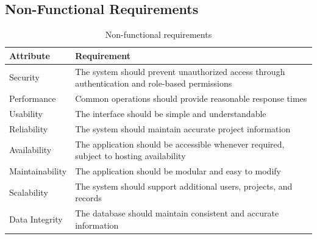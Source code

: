 \documentclass[11pt,a4paper]{article}
\newcommand{\hrow}{\rowcolor{gray!14}}
\newcommand{\tablestyle}{\centering\small\renewcommand{\arraystretch}{1.3}}
\begin{document}
\subsection{Non-Functional Requirements}
\begin{table}[H]
\tablestyle
\begin{tabularx}{\linewidth}{>{\raggedright\arraybackslash}p{3.2cm}Y}
\toprule
\hrow\textbf{Attribute} & \textbf{Requirement}\\
\midrule
Security & The system should prevent unauthorized access through authentication and role-based permissions\\
Performance & Common operations should provide reasonable response times\\
Usability & The interface should be simple and understandable\\
Reliability & The system should maintain accurate project information\\
Availability & The application should be accessible whenever required, subject to hosting availability\\
Maintainability & The application should be modular and easy to modify\\
Scalability & The system should support additional users, projects, and records\\
Data Integrity & The database should maintain consistent and accurate information\\
\bottomrule
\end{tabularx}
\caption{Non-functional requirements}
\end{table}
\end{document}
